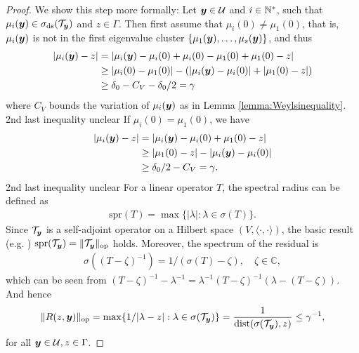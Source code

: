 \begin{proof}
We show this step more formally:  
Let ${\boldsymbol{y}} \in \mathcal{U}$ and $i \in \mathbb{N}^*$, such that $\mu_{i}({\boldsymbol{y}}) \in \sigma_{\mathrm{ds}}(\mathcal{T}_{\boldsymbol{y}})$ and $ z \in \Gamma$. 
Then first assume that $\mu_i(0) \neq \mu_1(0)$, that is, $\mu_i({\boldsymbol{y}})$ is not in the first eigenvalue cluster $ \{\mu_1({\boldsymbol{y}}),\ldots, \mu_s({\boldsymbol{y}}) \}$, and thus
\begin{align*}
         \vert \mu_{i}({\boldsymbol{y}}) - z  \vert &=  \vert  \mu_{i}({\boldsymbol{y}}) -  \mu_{i}(0) + \mu_{i}(0) -  \mu_{1}(0) +\mu_{1}(0)  - z\vert  \\ 
          &\geq \vert   \mu_{i}(0) -  \mu_{1}(0) \vert - (\vert \mu_{i}({\boldsymbol{y}}) -  \mu_{i}(0) \vert   + \vert \mu_{1}(0)  - z \vert)   \\
         &\geq \delta_0  - C_V  - \delta_0/2= \gamma
\end{align*} where $C_V$ bounds the variation of $\mu_i({\boldsymbol{y}})$ as in Lemma \ref{lemma:Weylsinequality}. \ac{2nd last inequality unclear}
If  $\mu_i(0) = \mu_1(0)$, we have 
\begin{align*}
    \vert \mu_{i}({\boldsymbol{y}}) - z  \vert   &= \vert  \mu_{i}({\boldsymbol{y}}) -  \mu_{i}(0) +\mu_{1}(0)  - z\vert 
    \\ & \geq  \vert \mu_{1}(0)  -z \vert  -  \vert   \mu_{i}({\boldsymbol{y}}) -  \mu_{i}(0)\vert \\
    &\geq \delta_0/2 -C_V = \gamma.
\end{align*}\ac{2nd last inequality unclear}
For a linear operator $T$, the spectral radius can be defined as \cite[I-(5.12)]{kato1995perturbation}
\begin{align*}
    \mathrm{spr}(T) = \max \{ \vert \lambda \vert : \lambda \in \sigma(T) \}.
\end{align*}
Since $\mathcal{T}_{\boldsymbol{y}}$ is a self-adjoint operator on a Hilbert space $(V, \langle \cdot, \cdot\rangle)$, the basic result (e.g.  \cite[V-(2.4)]{kato1995perturbation})  $\mathrm{spr}  (\mathcal{T}_{\boldsymbol{y}}) = \| \mathcal{T}_{\boldsymbol{y}} \|_{\mathrm{op}} $ holds. Moreover, the spectrum of the residual is 
\begin{align*}
\sigma((T-\zeta)^{-1}) = 1/(\sigma(T)-\zeta), \quad \zeta \in \mathbb{C},
\end{align*}
which can be seen from $(T-\zeta)^{-1} - \lambda^{-1} =  \lambda^{-1} (T-\zeta)^{-1} (\lambda - (T-\zeta))$. 
And hence
\begin{align*}
     \| R(z,{\boldsymbol{y}})  \|_{\mathrm{op}} =  \max\{1/\vert \lambda - z \vert : \lambda \in \sigma(\mathcal{T}_{\boldsymbol{y}}) \}  =  \frac{1} {\text{dist}(\sigma(\mathcal{T}_{{\boldsymbol{y}}}), z)}  \leq \gamma^{-1},
\end{align*}
for all $ {\boldsymbol{y}} \in \mathcal{U}, z \in \Gamma$.


\end{proof}
